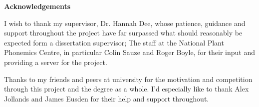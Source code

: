 \thispagestyle{empty}

\begin{center}
    {\LARGE\bf Acknowledgements}
\end{center}

I wish to thank my supervisor, Dr. Hannah Dee, whose patience, guidance and support throughout the project have far surpassed what should reasonably be expected form a dissertation supervisor; The staff at the National Plant Phonemics Centre, in particular Colin Sauze and Roger Boyle, for their input and providing a server for the project. 

Thanks to  my friends and peers at university for the motivation and competition through this project and the degree as a whole. I'd especially like to thank Alex Jollands and James Eusden for their help and support throughout.



